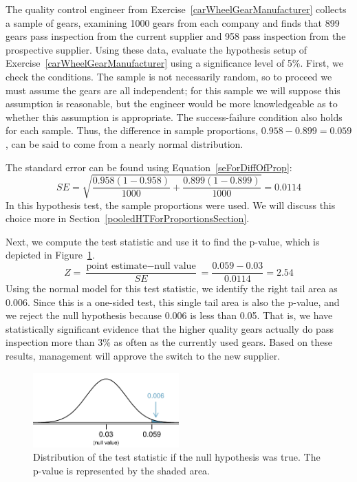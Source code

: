 \begin{example}{The quality control engineer from Exercise~\ref{carWheelGearManufacturer} collects a sample of gears, examining 1000 gears from each company and finds that 899 gears pass inspection from the current supplier and 958 pass inspection from the prospective supplier. Using these data, evaluate the hypothesis setup of Exercise~\ref{carWheelGearManufacturer} using a significance level of 5\%.}
First, we check the conditions. The sample is not necessarily random, so to proceed we must assume the gears are all independent; for this sample we will suppose this assumption is reasonable, but the engineer would be more knowledgeable as to whether this assumption is appropriate. The success-failure condition also holds for each sample. Thus, the difference in sample proportions, $0.958-0.899=0.059$, can be said to come from a nearly normal distribution.

The standard error can be found using Equation~\eqref{seForDiffOfProp}:
$$SE = \sqrt{\frac{0.958(1-0.958)}{1000} + \frac{0.899(1-0.899)}{1000}} = 0.0114$$
In this hypothesis test, the sample proportions were used. We will discuss this choice more in Section~\ref{pooledHTForProportionsSection}.

Next, we compute the test statistic and use it to find the p-value, which is depicted in Figure~\ref{gearsTwoSampleHTPValueQC}.
$$Z = \frac{\text{point estimate} - \text{null value}}{SE} = \frac{0.059 - 0.03}{0.0114} = 2.54$$
Using the normal model for this test statistic, we identify the right tail area as 0.006. Since this is a one-sided test, this single tail area is also the p-value, and we reject the null hypothesis because 0.006 is less than 0.05. That is, we have statistically significant evidence that the higher quality gears actually do pass inspection more than 3\% as often as the currently used gears. Based on these results, management will approve the switch to the new supplier.
\end{example}

\begin{figure}
\centering
\includegraphics[width=0.5\textwidth]{06/figures/gearsTwoSampleHTPValueQC/gearsTwoSampleHTPValueQC}
\caption{Distribution of the test statistic if the null hypothesis was true. The p-value is represented by the shaded area.}
\label{gearsTwoSampleHTPValueQC}
\end{figure}

